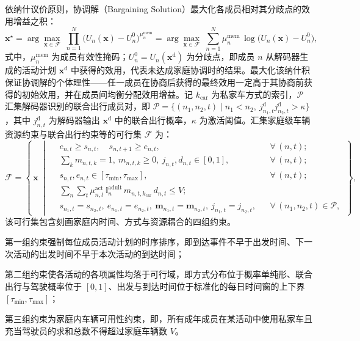 依纳什议价原则，协调解（Bargaining Solution）最大化各成员相对其分歧点的效用增益之积：
\begin{equation}
\mathbf{x}^{\star}=\arg\max_{\mathbf{x}\in\mathcal{F}}\;\prod_{n=1}^{N}\bigl(U_n(\mathbf{x})-U_n^{0}\bigr)^{\mu_n^{\mathrm{mem}}}
=\arg\max_{\mathbf{x}\in\mathcal{F}}\;\sum_{n=1}^{N}\mu_n^{\mathrm{mem}}\,\log\bigl(U_n(\mathbf{x})-U_n^{0}\bigr),
\label{eq.cohact.nashobj}
\end{equation}
式中，$\mu_n^{\mathrm{mem}}$ 为成员有效性掩码；$U_n^{0}=U_n(\mathbf{x}^{\mathrm{d}})$ 为分歧点，即成员 $n$ 从解码器生成的活动计划 $\mathbf{x}^{\mathrm{d}}$ 中获得的效用，代表未达成家庭协调时的结果。最大化该纳什积保证协调解的个体理性——任一成员在协商后获得的最终效用一定高于其协商前获得的初始效用，并在成员间均衡分配效用增益。记 $k_{\mathrm{car}}$ 为私家车方式的索引，$\mathcal{P}$ 汇集解码器识别的联合出行成员对，即 $\mathcal{P}=\{(n_1,n_2,t)\mid n_1<n_2,\ j^{\mathrm{d}}_{n_1,t}j^{\mathrm{d}}_{n_2,t}>\kappa\}$，其中 $j^{\mathrm{d}}_{n,t}$ 为解码器输出 $\mathbf{x}^{\mathrm{d}}$ 中的联合出行概率，$\kappa$ 为激活阈值。汇集家庭级车辆资源约束与联合出行约束等的可行集 $\mathcal{F}$ 为：
\begin{equation}
\mathcal{F}=\left\{\,\mathbf{x}\ \middle|\
\begin{aligned}
&e_{n,t}\ge s_{n,t},\quad s_{n,t+1}\ge e_{n,t}, && \forall\,(n,t);\\
&\textstyle\sum_{k}m_{n,t,k}=1,\ m_{n,t,k}\ge 0,\ j_{n,t},d_{n,t}\in[0,1], && \forall\,(n,t);\\
&s_{n,t},e_{n,t}\in[\tau_{\min},\tau_{\max}], && \forall\,(n,t);\\
&\textstyle\sum_{n}\sum_{t}\mu_{n,t}^{\mathrm{act}}\,\mathbb{I}_{n}^{\mathrm{adult}}\,m_{n,t,k_{\mathrm{car}}}\,d_{n,t}\le V; & \\
&s_{n_1,t}=s_{n_2,t},\ e_{n_1,t}=e_{n_2,t},\ \mathbf{m}_{n_1,t}=\mathbf{m}_{n_2,t},\ j_{n_1,t}=j_{n_2,t}, && \forall\,(n_1,n_2,t)\in\mathcal{P},
\end{aligned}
\,\right\},
\label{eq.cohact.feasible}
\end{equation}
该可行集包含刻画家庭内时间、方式与资源耦合的四组约束。

第一组约束强制每位成员活动计划的时序排序，即到达事件不早于出发时间、下一次活动的出发时间不早于本次活动的到达时间；

第二组约束使各活动的各项属性均落于可行域，即方式分布位于概率单纯形、联合出行与驾驶概率位于 $[0,1]$、出发与到达时间位于标准化的每日时间窗的上下界 $[\tau_{\min},\tau_{\max}]$；

第三组约束为家庭内车辆可用性约束，即，所有成年成员在某活动中使用私家车且充当驾驶员的求和总数不得超过家庭车辆数 $V$。

